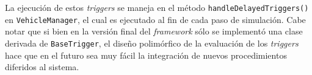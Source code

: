 \begin{figure}[htpb]
    
\end{figure}


La ejecución de estos \emph{triggers} se maneja en el método \texttt{handleDelayedTriggers()} en \texttt{VehicleManager}, el cual es ejecutado al fin de cada paso de simulación. Cabe notar que si bien en la versión final del \emph{framework} sólo se implementó una clase derivada de \texttt{BaseTrigger}, el diseño polimórfico de la evaluación de los \emph{triggers} hace que en el futuro sea muy fácil la integración de nuevos procedimientos diferidos al sistema.

\begin{figure}[htpb]
    
\end{figure}


